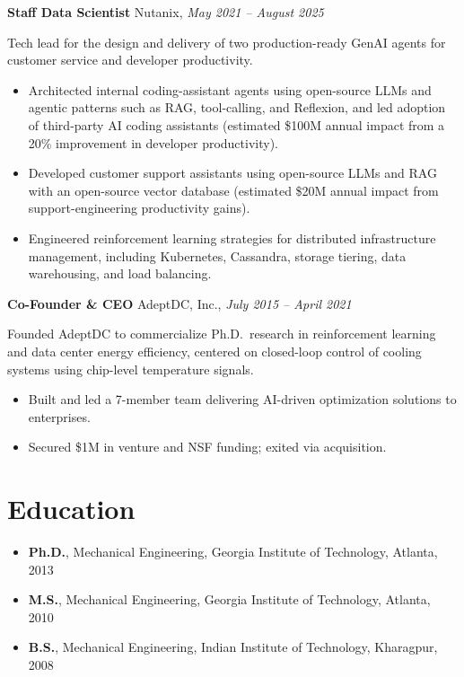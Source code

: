 \documentclass[10.5pt]{article}
\newcommand{\role}[3]{\textbf{#1} \hfill #2, \textit{#3}\par}
\newcommand{\scope}[1]{\vspace{1pt}#1\par}
\begin{document}
\vspace{4pt}
\role{Staff Data Scientist}{Nutanix}{May 2021 -- August 2025}
\scope{Tech lead for the design and delivery of two production-ready GenAI agents for customer service and developer productivity.}
\begin{itemize}
  \item Architected internal coding-assistant agents using open-source LLMs and agentic patterns such as RAG, tool-calling, and Reflexion, and led adoption of third-party AI coding assistants (estimated \$100M annual impact from a 20\% improvement in developer productivity).
  \item Developed customer support assistants using open-source LLMs and RAG with an open-source vector database (estimated \$20M annual impact from support-engineering productivity gains).
  \item Engineered reinforcement learning strategies for distributed infrastructure management, including Kubernetes, Cassandra, storage tiering, data warehousing, and load balancing.
\end{itemize}

\vspace{4pt}
\role{Co-Founder \& CEO}{AdeptDC, Inc.}{July 2015 -- April 2021}
\scope{Founded AdeptDC to commercialize Ph.D.\ research in reinforcement learning and data center energy efficiency, centered on closed-loop control of cooling systems using chip-level temperature signals.}
\begin{itemize}
  \item Built and led a 7-member team delivering AI-driven optimization solutions to enterprises.
  \item Secured \$1M in venture and NSF funding; exited via acquisition.
\end{itemize}

\section{Education}
\begin{itemize}
  \item \textbf{Ph.D.}, Mechanical Engineering, Georgia Institute of Technology, Atlanta, 2013
  \item \textbf{M.S.}, Mechanical Engineering, Georgia Institute of Technology, Atlanta, 2010
  \item \textbf{B.S.}, Mechanical Engineering, Indian Institute of Technology, Kharagpur, 2008
\end{itemize}
\end{document}
